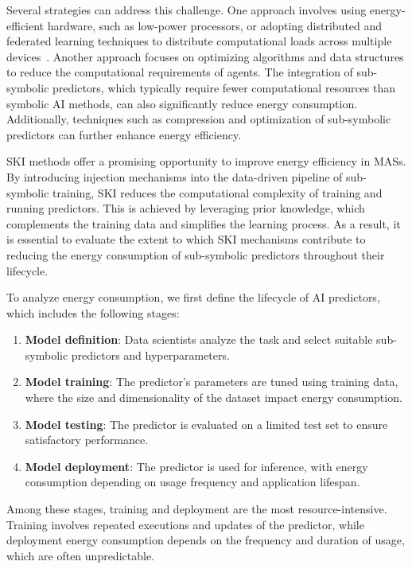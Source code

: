 %
Several strategies can address this challenge.
%
One approach involves using energy-efficient hardware, such as low-power processors, or adopting distributed and federated learning techniques to distribute computational loads across multiple devices~\cite{savazzi2021opportunities}.
%
Another approach focuses on optimizing algorithms and data structures to reduce the computational requirements of agents.
%
The integration of sub-symbolic predictors, which typically require fewer computational resources than symbolic \gls{AI} methods, can also significantly reduce energy consumption.
%
Additionally, techniques such as compression and optimization of sub-symbolic predictors can further enhance energy efficiency.

%
\gls{SKI} methods offer a promising opportunity to improve energy efficiency in \glspl{MAS}.
%
By introducing injection mechanisms into the data-driven pipeline of sub-symbolic training, \gls{SKI} reduces the computational complexity of training and running predictors.
%
This is achieved by leveraging prior knowledge, which complements the training data and simplifies the learning process.
%
As a result, it is essential to evaluate the extent to which \gls{SKI} mechanisms contribute to reducing the energy consumption of sub-symbolic predictors throughout their lifecycle.

%
To analyze energy consumption, we first define the lifecycle of \gls{AI} predictors, which includes the following stages:
%
\begin{enumerate}
    \item \textbf{Model definition}: Data scientists analyze the task and select suitable sub-symbolic predictors and hyperparameters.
    \item \textbf{Model training}: The predictor's parameters are tuned using training data, where the size and dimensionality of the dataset impact energy consumption.
    \item \textbf{Model testing}: The predictor is evaluated on a limited test set to ensure satisfactory performance.
    \item \textbf{Model deployment}: The predictor is used for inference, with energy consumption depending on usage frequency and application lifespan.
\end{enumerate}

%
Among these stages, training and deployment are the most resource-intensive.
%
Training involves repeated executions and updates of the predictor, while deployment energy consumption depends on the frequency and duration of usage, which are often unpredictable.

